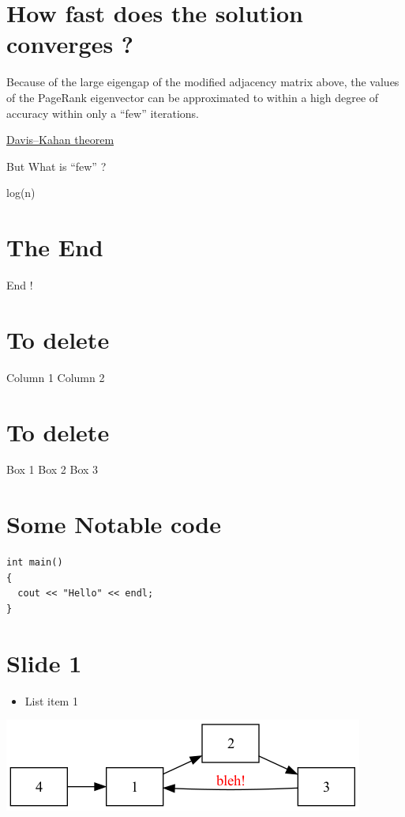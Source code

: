 \documentclass[11pt]{article}
\begin{document}
\section*{How fast does the solution converges ?}
\label{sec:orgcf2b619}
Because of the large eigengap of the modified adjacency matrix above, the values of the PageRank eigenvector can be approximated to within a high degree of accuracy within only a ``few'' iterations.

\href{https://en.wikipedia.org/wiki/Eigenvalue\_perturbation}{Davis–Kahan theorem}

But What is ``few'' ?

log(n)

\section*{The End}
\label{sec:orga1b9d75}
End !

\section*{To delete}
\label{sec:org22751a2}
Column 1
Column 2


\section*{To delete}
\label{sec:org0895524}
Box 1
Box 2
Box 3

\section*{Some Notable code}
\label{sec:org0466460}

\begin{verbatim}
int main()
{
  cout << "Hello" << endl;
}
\end{verbatim}
\section*{Slide 1}
\label{sec:org850f45b}
\begin{itemize}
\item List item 1
\end{itemize}

\begin{center}
\includegraphics[width=.9\linewidth]{test1.png}
\end{center}
\end{document}
